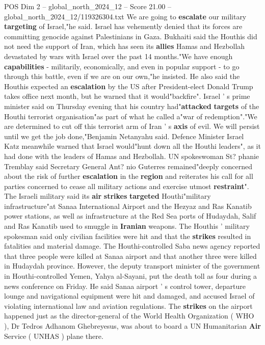 \begin{textsample}{POS Dim 2 – global\_north\_2024\_12 – Score 21.00 – global\_north\_2024\_12/119326304.txt}
We are going to \textbf{escalate} our military \textbf{targeting} of Israel,"he said.
Israel has vehemently denied that its forces are committing genocide against Palestinians in Gaza.
Bukhaiti said the Houthis did not need the support of Iran, which has seen its \textbf{allies} Hamas and Hezbollah devastated by wars with Israel over the past 14 months."We have enough \textbf{capabilities} - militarily, economically, and even in popular support - to go through this battle, even if we are on our own,"he insisted.
He also said the Houthis expected an \textbf{escalation} by the US after President-elect Donald Trump takes office next month, but he warned that it would"backfire".
Israel ' s prime minister said on Thursday evening that his country had"\textbf{attacked} \textbf{targets} of the Houthi terrorist organisation"as part of what he called a"war of redemption"."We are determined to cut off this terrorist arm of Iran ' s \textbf{axis} of evil.
We will persist until we get the job done,"Benjamin Netanyahu said.
Defence Minister Israel Katz meanwhile warned that Israel would"hunt down all the Houthi leaders", as it had done with the leaders of Hamas and Hezbollah.
UN spokeswoman St? phanie Tremblay said Secretary General Ant? nio Guterres remained"deeply concerned about the risk of further \textbf{escalation} in the \textbf{region} and reiterates his call for all parties concerned to cease all military actions and exercise utmost \textbf{restraint}".
The Israeli military said its \textbf{air} \textbf{strikes} \textbf{targeted} Houthi"military infrastructure"at Sanaa International Airport and the Hezyaz and Ras Kanatib power stations, as well as infrastructure at the Red Sea ports of Hudaydah, Salif and Ras Kanatib used to smuggle in \textbf{Iranian} weapons.
The Houthis ' military spokesman said only civilian facilities were hit and that the \textbf{strikes} resulted in fatalities and material damage.
The Houthi-controlled Saba news agency reported that three people were killed at Sanaa airport and that another three were killed in Hudaydah province.
However, the deputy transport minister of the government in Houthi-controlled Yemen, Yahya al-Sayani, put the death toll as four during a news conference on Friday.
He said Sanaa airport ' s control tower, departure lounge and navigational equipment were hit and damaged, and accused Israel of violating international law and aviation regulations.
The \textbf{strikes} on the airport happened just as the director-general of the World Health Organization ( WHO ), Dr Tedros Adhanom Ghebreyesus, was about to board a UN Humanitarian \textbf{Air} Service ( UNHAS ) plane there.

\end{textsample}
